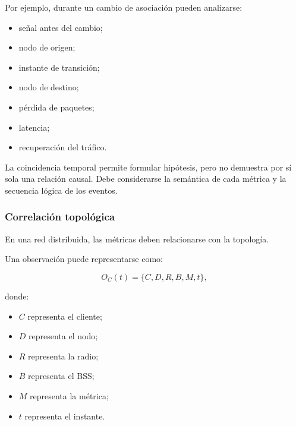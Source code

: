Por ejemplo, durante un cambio de asociación pueden analizarse:

\begin{itemize}
    \item señal antes del cambio;

    \item nodo de origen;

    \item instante de transición;

    \item nodo de destino;

    \item pérdida de paquetes;

    \item latencia;

    \item recuperación del tráfico.
\end{itemize}

La coincidencia temporal permite formular hipótesis, pero no demuestra
por sí sola una relación causal. Debe considerarse la semántica de cada
métrica y la secuencia lógica de los eventos.


\subsubsection*{Correlación topológica}

En una red distribuida, las métricas deben relacionarse con la topología.

Una observación puede representarse como:

\[
    O_C(t)
    =
    \{
        C,
        D,
        R,
        B,
        M,
        t
    \},
\]

donde:

\begin{itemize}
    \item \(C\) representa el cliente;

    \item \(D\) representa el nodo;

    \item \(R\) representa la radio;

    \item \(B\) representa el BSS;

    \item \(M\) representa la métrica;

    \item \(t\) representa el instante.
\end{itemize}

